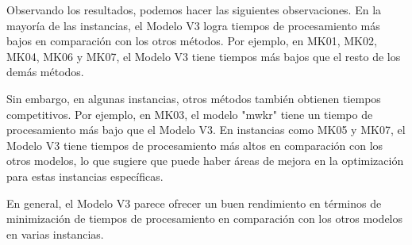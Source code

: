 Observando los resultados, podemos hacer las siguientes observaciones. En la mayoría de 
las instancias, el Modelo V3 logra tiempos de procesamiento más bajos en comparación con 
los otros métodos. Por ejemplo, en MK01, MK02, MK04, MK06 y MK07, el Modelo V3 tiene 
tiempos más bajos que el resto de los demás métodos.\medskip

Sin embargo, en algunas instancias, otros métodos también obtienen tiempos competitivos. 
Por ejemplo, en MK03, el modelo "mwkr" tiene un tiempo de procesamiento más bajo que el Modelo V3.
En instancias como MK05 y MK07, el Modelo V3 tiene tiempos de procesamiento más altos en comparación 
con los otros modelos, lo que sugiere que puede haber áreas de mejora en la optimización para estas 
instancias específicas.\medskip

En general, el Modelo V3 parece ofrecer un buen rendimiento en términos de minimización de tiempos 
de procesamiento en comparación con los otros modelos en varias instancias.\medskip